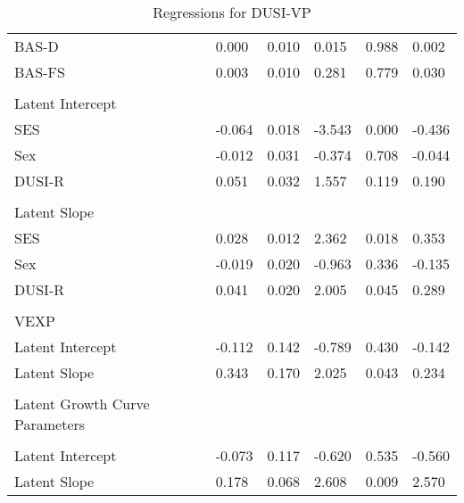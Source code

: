 \documentclass[utf8]{article}
\begin{document}
\begin{table}[]
\begin{tabular}{llllll}
BAS-D                          & 0.000    & 0.010      & 0.015   & 0.988                    & 0.002   \\
BAS-FS                         & 0.003    & 0.010      & 0.281   & 0.779                    & 0.030   \\
                               &          &            &         &                          &         \\
Latent Intercept               &          &            &         &                          &         \\
SES                            & -0.064   & 0.018      & -3.543  & 0.000                    & -0.436  \\
Sex                            & -0.012   & 0.031      & -0.374  & 0.708                    & -0.044  \\
DUSI-R                         & 0.051    & 0.032      & 1.557   & 0.119                    & 0.190   \\
                               &          &            &         &                          &         \\
Latent Slope                   &          &            &         &                          &         \\
SES                            & 0.028    & 0.012      & 2.362   & 0.018                    & 0.353   \\
Sex                            & -0.019   & 0.020      & -0.963  & 0.336                    & -0.135  \\
DUSI-R                         & 0.041    & 0.020      & 2.005   & 0.045                    & 0.289   \\
                               &          &            &         &                          &         \\
VEXP                           &          &            &         &                          &         \\
Latent Intercept               & -0.112   & 0.142      & -0.789  & 0.430                    & -0.142  \\
Latent Slope                   & 0.343    & 0.170      & 2.025   & 0.043                    & 0.234   \\
                               &          &            &         &                          &         \\
Latent Growth Curve Parameters &          &            &         &                          &         \\ \hline
                               &          &            &         &                          &         \\
Latent Intercept               & -0.073   & 0.117      & -0.620  & 0.535                    & -0.560  \\
Latent Slope                   & 0.178    & 0.068      & 2.608   & 0.009                    & 2.570  
\end{tabular}
\caption{Regressions for DUSI-VP\label{tab:4}}
\end{table}
\end{document}
